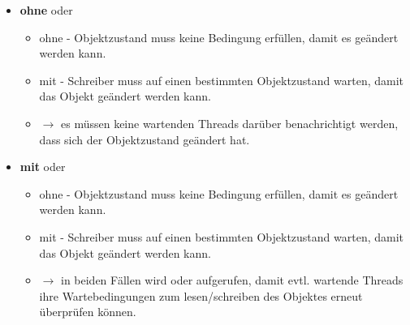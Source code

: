 \begin{itemize}
    \item \textbf{ohne}  oder 
    \begin{itemize}
        \item ohne  - Objektzustand muss keine Bedingung erfüllen, damit es geändert werden kann.
        \item mit  - Schreiber muss auf einen bestimmten Objektzustand warten, damit das Objekt geändert werden kann.
        \item[] $\rightarrow$ es müssen keine wartenden Threads darüber benachrichtigt werden, dass sich der Objektzustand geändert hat.
    \end{itemize}
    \item \textbf{mit}  oder 
    \begin{itemize}
        \item ohne  - Objektzustand muss keine Bedingung erfüllen, damit es geändert werden kann.
        \item mit  - Schreiber muss auf einen bestimmten Objektzustand warten, damit das Objekt geändert werden kann.
        \item[] $\rightarrow$ in beiden Fällen wird  oder  aufgerufen, damit evtl. wartende Threads ihre Wartebedingungen zum lesen/schreiben des Objektes erneut überprüfen können.
    \end{itemize}

\end{itemize}



